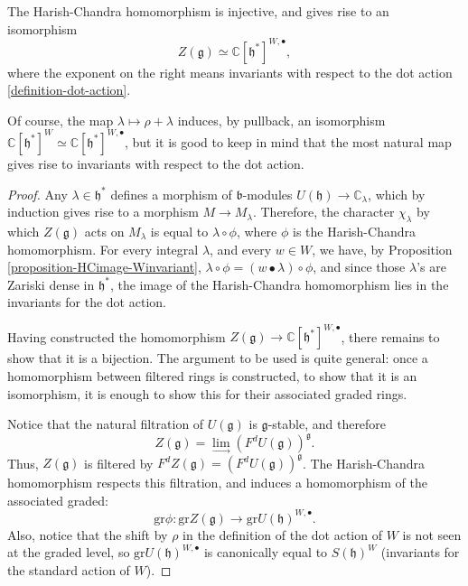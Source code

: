\begin{theorem}
\label{theorem-HC-isomorphism}
 The Harish-Chandra homomorphism is injective, and gives rise to an isomorphism
 $$ Z(\mathfrak g) \simeq \mathbb C[\mathfrak h^*]^{W, \bullet},$$
 where the exponent on the right means invariants with respect to the dot action \ref{definition-dot-action}.
\end{theorem}

 Of course, the map $\lambda\mapsto \rho+\lambda$ induces, by pullback, an isomorphism $\mathbb C[\mathfrak h^*]^W \simeq \mathbb C[\mathfrak h^*]^{W,\bullet}$, but it is good to keep in mind that the most natural map gives rise to invariants with respect to the dot action.

\begin{proof}
Any $\lambda\in \mathfrak h^*$ defines a morphism of $\mathfrak b$-modules
$U(\mathfrak h)\to \mathbb C_\lambda$, which by induction gives rise to a morphism $M\to M_\lambda$. Therefore, the character $\chi_\lambda$ by which $Z(\mathfrak g)$ acts on $M_\lambda$ is equal to $\lambda \circ \phi$, where $\phi$ is the Harish-Chandra homomorphism. For every integral $\lambda$, and every $w\in W$, we have, by Proposition \ref{proposition-HCimage-Winvariant}, $\lambda \circ \phi = (w\bullet \lambda)\circ\phi$, and since those $\lambda$'s are Zariski dense in $\mathfrak h^*$, the image of the Harish-Chandra homomorphism lies in the invariants for the dot action. 

Having constructed the homomorphism $Z(\mathfrak g) \to \mathbb C[\mathfrak h^*]^{W,\bullet}$, there remains to show that it is a bijection. The argument to be used is quite general: once a homomorphism between filtered rings is constructed, to show that it is an isomorphism, it is enough to show this for their associated graded rings. 

Notice that the natural filtration of $U(\mathfrak g)$ is $\mathfrak g$-stable, and therefore 
$$ Z(\mathfrak g) = \underset{\to}{\lim} (F^d U(\mathfrak g))^{\mathfrak g}.$$
Thus, $Z(\mathfrak g)$ is filtered by $F^d Z(\mathfrak g)= (F^d U(\mathfrak g))^{\mathfrak g}$. The Harish-Chandra homomorphism respects this filtration, and induces a homomorphism of the associated graded:
$$ \text{gr} \phi : \text{gr} Z(\mathfrak g) \to \text{gr} U(\mathfrak h)^{W,\bullet}.$$
Also, notice that the shift by $\rho$ in the definition of the dot action of $W$ is not seen at the graded level, so $\text{gr} U(\mathfrak h)^{W,\bullet}$ is canonically equal to $S(\mathfrak h)^W$ (invariants for the standard action of $W$). 


\end{proof}
